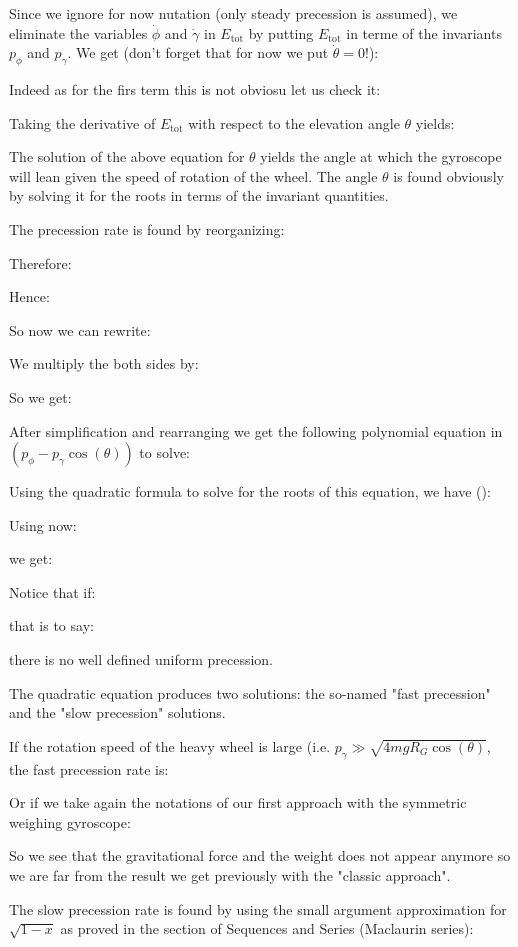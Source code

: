 	Since we ignore for now nutation (only steady precession is assumed), we eliminate the variables $\dot{\phi}$ and $\dot{\gamma}$ in $E_{\text{tot}}$ by putting $E_{\text{tot}}$ in terme of the invariants $p_\phi$ and $p_\gamma$. We get (don't forget that for now we put $\dot{\theta}=0$!):
	
	Indeed as for the firs term this is not obviosu let us check it:
	
	Taking the derivative of $E_\text{tot}$ with respect to the elevation angle $\theta$ yields:
	
	The solution of the above equation for $\theta$ yields the angle at which the gyroscope will lean given the speed of rotation of the wheel. The angle $\theta$ is found obviously by solving it for the roots in terms of the invariant quantities.

	The precession rate is found by reorganizing:
	
	Therefore:
	
	Hence:
	
	So now we can rewrite:
	
	
	We multiply the both sides by:
	
	So we get:
	
	After simplification and rearranging we get the following polynomial equation in $(p_\phi-p_\gamma\cos(\theta))$ to solve:
	
	Using the quadratic formula to solve for the roots of this equation, we have ():
	
	Using now:
	
	we get:
	
	Notice that if:
	
	that is to say:
	
	there is no well defined uniform precession. 
	
	The quadratic equation produces two solutions: the so-named "fast precession" and the "slow precession" solutions.

	If the rotation speed of the heavy wheel is large (i.e. $p_\gamma \gg\sqrt{4mgR_G\cos(\theta)}$, the fast precession rate is:
	
	Or if we take again the notations of our first approach with the symmetric weighing gyroscope:
	
	So we see that the gravitational force and the weight does not appear anymore so we are far from the result we get previously with the "classic approach".
	
	The slow precession rate is found by using the small argument approximation for $\sqrt{1-x}$ as proved in the section of Sequences and Series (Maclaurin series):
	
